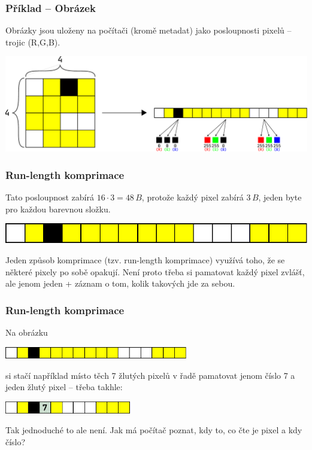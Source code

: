 \documentclass[aspectratio=169,11pt,svgnames,handout]{beamer}
\begin{document}
\begin{frame}
 \frametitle{Příklad -- Obrázek}
 Obrázky jsou uloženy na počítači (kromě metadat) jako posloupnosti pixelů --
 trojic (R,G,B).
 \begin{center}
  \includegraphics[width=\textwidth]{image-3.pdf}
 \end{center}
\end{frame}

\begin{frame}
 \frametitle{Run-length komprimace}
 Tato posloupnost zabírá $16 \cdot 3 = 48\,B$, protože každý pixel zabírá
 $3\,B$, jeden byte pro každou barevnou složku.
 \begin{center}
  \includegraphics[width=.5\textwidth]{image-4.pdf}
 \end{center}
 \pause
 Jeden způsob komprimace (tzv. \alert{run-length} komprimace) využívá toho, že
 se některé pixely po sobě opakují.
 \pause
 Není proto třeba si pamatovat každý pixel zvlášť, ale jenom jeden + záznam o
 tom, kolik takových jde za sebou.
\end{frame}

\begin{frame}
 \frametitle{Run-length komprimace}
 Na obrázku
 \begin{center}
  \includegraphics[width=8cm]{image-4.pdf}
 \end{center}
 si stačí například místo těch 7 žlutých pixelů v řadě pamatovat jenom číslo 7 a
 jeden žlutý pixel -- třeba takhle:
 \begin{center}
  \includegraphics[width=5.5cm]{image-5.pdf}
 \end{center}
 \pause
 Tak jednoduché to ale není. Jak má počítač poznat, kdy to, co čte je pixel a
 kdy číslo?
\end{frame}
\end{document}
